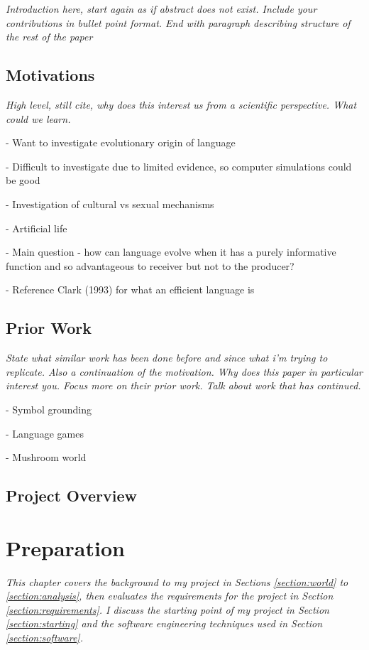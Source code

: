 \documentclass[12pt,a4paper,twoside,openright]{report}
\begin{document}
\emph{Introduction here, start again as if abstract does not exist. Include your contributions in bullet point format. End with paragraph describing structure of the rest of the paper}

\section{Motivations}

\emph{High level, still cite, why does this interest us from a scientific perspective. What could we learn.}

- Want to investigate evolutionary origin of language

- Difficult to investigate due to limited evidence, so computer simulations could be good

- Investigation of cultural vs sexual mechanisms

- Artificial life

- Main question - how can language evolve when it has a purely informative function and so advantageous to receiver but not to the producer?

- Reference Clark (1993) for what an efficient language is

\section{Prior Work}

\emph{State what similar work has been done before and since what i'm trying to replicate. Also a continuation of the motivation. Why does this paper in particular interest you. Focus more on their prior work. Talk about work that has continued.}

- Symbol grounding

- Language games

- Mushroom world

\section{Project Overview}


\chapter{Preparation}\label{chapter:preparation}

\emph{This chapter covers the background to my project in Sections \ref{section:world} to \ref{section:analysis}, then evaluates the requirements for the project in Section \ref{section:requirements}. I discuss the starting point of my project in Section \ref{section:starting} and the software engineering techniques used in Section \ref{section:software}.}
\end{document}
